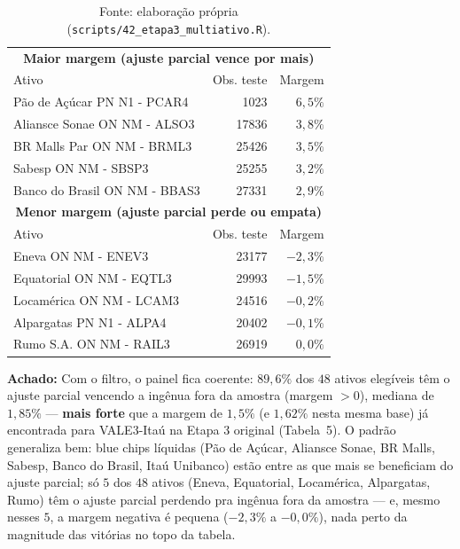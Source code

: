 \documentclass[11pt,a4paper]{article}
\newcommand{\aha}[1]{\par\vspace{4pt}\noindent\textbf{\color{vermelho}Achado:} #1\par\vspace{2pt}}
\begin{document}
\begin{table}[h]\centering\small
\caption{Os 10 ativos com maior e menor margem do ajuste parcial sobre a ingênua fora da amostra
($h=1$), entre os 48 com posição relevante.}
\begin{tabular}{@{}lrr@{}}
\toprule
\multicolumn{3}{c}{\textbf{Maior margem (ajuste parcial vence por mais)}} \\
Ativo & Obs. teste & Margem \\
\midrule
Pão de Açúcar PN N1 - PCAR4 & 1023 & $6{,}5\%$ \\
Aliansce Sonae ON NM - ALSO3 & 17836 & $3{,}8\%$ \\
BR Malls Par ON NM - BRML3 & 25426 & $3{,}5\%$ \\
Sabesp ON NM - SBSP3 & 25255 & $3{,}2\%$ \\
Banco do Brasil ON NM - BBAS3 & 27331 & $2{,}9\%$ \\
\midrule
\multicolumn{3}{c}{\textbf{Menor margem (ajuste parcial perde ou empata)}} \\
Ativo & Obs. teste & Margem \\
\midrule
Eneva ON NM - ENEV3 & 23177 & $-2{,}3\%$ \\
Equatorial ON NM - EQTL3 & 29993 & $-1{,}5\%$ \\
Locamérica ON NM - LCAM3 & 24516 & $-0{,}2\%$ \\
Alpargatas PN N1 - ALPA4 & 20402 & $-0{,}1\%$ \\
Rumo S.A. ON NM - RAIL3 & 26919 & $0{,}0\%$ \\
\bottomrule
\end{tabular}
\caption*{\footnotesize Fonte: elaboração própria (\texttt{scripts/42\_etapa3\_multiativo.R}).}
\end{table}

\aha{Com o filtro, o painel fica coerente: $89{,}6\%$ dos $48$ ativos elegíveis têm o ajuste
parcial vencendo a ingênua fora da amostra (margem $>0$), mediana de $1{,}85\%$ --- \textbf{mais
forte} que a margem de $1{,}5\%$ (e $1{,}62\%$ nesta mesma base) já encontrada para VALE3-Itaú na
Etapa 3 original (Tabela~5). O padrão generaliza bem: blue chips líquidas (Pão de Açúcar, Aliansce
Sonae, BR Malls, Sabesp, Banco do Brasil, Itaú Unibanco) estão entre as que mais se beneficiam do
ajuste parcial; só $5$ dos $48$ ativos (Eneva, Equatorial, Locamérica, Alpargatas, Rumo) têm o
ajuste parcial perdendo pra ingênua fora da amostra --- e, mesmo nesses $5$, a margem negativa é
pequena ($-2{,}3\%$ a $-0{,}0\%$), nada perto da magnitude das vitórias no topo da tabela.}
\end{document}
